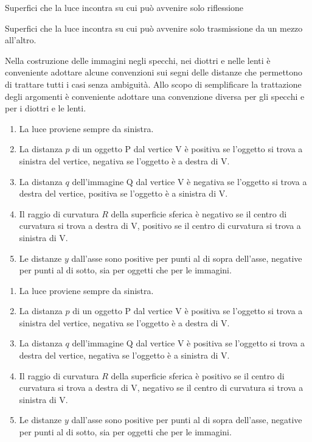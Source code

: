 \begin{defn}[specchi]
    Superfici che la luce incontra su cui può avvenire solo riflessione
\end{defn}
\begin{defn}[diottri]
    Superfici che la luce incontra su cui può avvenire solo trasmissione da un mezzo all'altro.
\end{defn}
Nella costruzione delle immagini negli specchi, nei diottri e nelle lenti è conveniente adottare alcune convenzioni sui segni delle distanze che permettono di trattare tutti i casi senza ambiguità. Allo scopo di semplificare la trattazione degli argomenti è conveniente adottare una convenzione diversa per gli specchi e per i diottri e le lenti.
\begin{axiom}\hfill
    \begin{enumerate}
        \item La luce proviene sempre da sinistra.
        \item La distanza $p$ di un oggetto P dal vertice V è positiva se l'oggetto si trova a sinistra del vertice, negativa se l'oggetto è a destra di V.
        \item La distanza $q$ dell'immagine Q dal vertice V è negativa se l'oggetto si trova a destra del vertice, positiva se l'oggetto è a sinistra di V.
        \item Il raggio di curvatura $R$ della superficie sferica è negativo se il centro di curvatura si trova a destra di V, positivo se il centro di curvatura si trova a sinistra di V.
        \item Le distanze $y$ dall'asse sono positive per punti al di sopra dell'asse, negative per punti al di sotto, sia per oggetti che per le immagini.
    \end{enumerate}
\end{axiom}
\begin{axiom}\hfill
    \begin{enumerate}
        \item La luce proviene sempre da sinistra.
        \item La distanza $p$ di un oggetto P dal vertice V è positiva se l'oggetto si trova a sinistra del vertice, negativa se l'oggetto è a destra di V.
        \item La distanza $q$ dell'immagine Q dal vertice V è positiva se l'oggetto si trova a destra del vertice, negativa se l'oggetto è a sinistra di V.
        \item Il raggio di curvatura $R$ della superficie sferica è positivo se il centro di curvatura si trova a destra di V, negativo se il centro di curvatura si trova a sinistra di V.
        \item Le distanze $y$ dall'asse sono positive per punti al di sopra dell'asse, negative per punti al di sotto, sia per oggetti che per le immagini.
    \end{enumerate}
\end{axiom}
